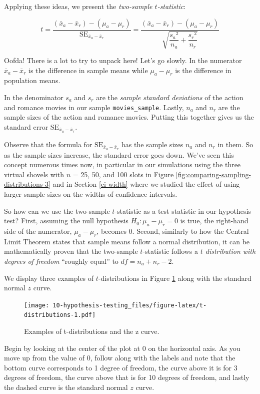 \documentclass[
]{book}
\begin{document}
Applying these ideas, we present the \emph{two-sample \(t\)-statistic}:

\[t = \dfrac{ (\bar{x}_a - \bar{x}_r) - (\mu_a - \mu_r)}{ \text{SE}_{\bar{x}_a - \bar{x}_r} } = \dfrac{ (\bar{x}_a - \bar{x}_r) - (\mu_a - \mu_r)}{ \sqrt{\dfrac{{s_a}^2}{n_a} + \dfrac{{s_r}^2}{n_r}}  }\]

Oofda! There is a lot to try to unpack here! Let's go slowly. In the numerator \(\bar{x}_a-\bar{x}_r\) is the difference in sample means while \(\mu_a - \mu_r\) is the difference in population means.

In the denominator \(s_a\) and \(s_r\) are the \emph{sample standard deviations} of the action and romance movies in our sample \texttt{movies\_sample}. Lastly, \(n_a\) and \(n_r\) are the sample sizes of the action and romance movies. Putting this together gives us the standard error \(\text{SE}_{\bar{x}_a - \bar{x}_r}\).

Observe that the formula for \(\text{SE}_{\bar{x}_a - \bar{x}_r}\) has the sample sizes \(n_a\) and \(n_r\) in them. So as the sample sizes increase, the standard error goes down. We've seen this concept numerous times now, in particular in our simulations using the three virtual shovels with \(n\) = 25, 50, and 100 slots in Figure \ref{fig:comparing-sampling-distributions-3} and in Section \ref{ci-width} where we studied the effect of using larger sample sizes on the widths of confidence intervals.

So how can we use the two-sample \(t\)-statistic as a test statistic in our hypothesis test? First, assuming the null hypothesis \(H_0: \mu_a - \mu_r = 0\) is true, the right-hand side of the numerator, \(\mu_a - \mu_r\), becomes 0. Second, similarly to how the Central Limit Theorem states that sample means follow a normal distribution, it can be mathematically proven that the two-sample \(t\)-statistic follows a \emph{\(t\) distribution with degrees of freedom} ``roughly equal'' to \(df = n_a + n_r - 2\).

We display three examples of \(t\)-distributions in Figure \ref{fig:t-distributions} along with the standard normal \(z\) curve.

\begin{figure}
\centering
\texttt{[image: 10-hypothesis-testing\_files/figure-latex/t-distributions-1.pdf]}
\caption{\label{fig:t-distributions}Examples of t-distributions and the z curve.}
\end{figure}

Begin by looking at the center of the plot at 0 on the horizontal axis. As you move up from the value of 0, follow along with the labels and note that the bottom curve corresponds to 1 degree of freedom, the curve above it is for 3 degrees of freedom, the curve above that is for 10 degrees of freedom, and lastly the dashed curve is the standard normal \(z\) curve.
\end{document}
